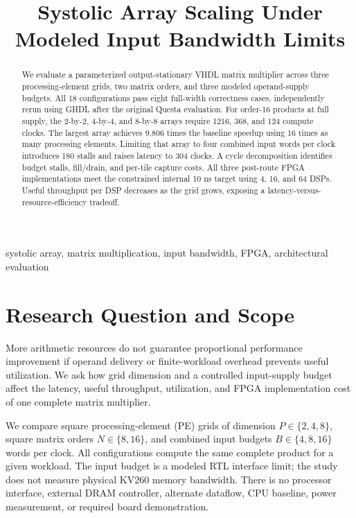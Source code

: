 \documentclass[conference]{IEEEtran}
\title{Systolic Array Scaling Under Modeled Input Bandwidth Limits}
\author{\IEEEauthorblockN{Ozlem Polat, Thomas Martin, and Keith Kamer}
\IEEEauthorblockA{University of Florida\\EEL5764 Computer Architecture, Fall 2026}}
\begin{document}
\maketitle
\begin{abstract}
We evaluate a parameterized output-stationary VHDL matrix multiplier across three processing-element grids, two matrix orders, and three modeled operand-supply budgets. All 18 configurations pass eight full-width correctness cases, independently rerun using GHDL after the original Questa evaluation. For order-16 products at full supply, the 2-by-2, 4-by-4, and 8-by-8 arrays require 1216, 368, and 124 compute clocks. The largest array achieves 9.806 times the baseline speedup using 16 times as many processing elements. Limiting that array to four combined input words per clock introduces 180 stalls and raises latency to 304 clocks. A cycle decomposition identifies budget stalls, fill/drain, and per-tile capture costs. All three post-route FPGA implementations meet the constrained internal 10 ns target using 4, 16, and 64 DSPs. Useful throughput per DSP decreases as the grid grows, exposing a latency-versus-resource-efficiency tradeoff.
\end{abstract}
\begin{IEEEkeywords}
systolic array, matrix multiplication, input bandwidth, FPGA, architectural evaluation
\end{IEEEkeywords}

\section{Research Question and Scope}
More arithmetic resources do not guarantee proportional performance improvement if operand delivery or finite-workload overhead prevents useful utilization. We ask how grid dimension and a controlled input-supply budget affect the latency, useful throughput, utilization, and FPGA implementation cost of one complete matrix multiplier.

We compare square processing-element (PE) grids of dimension $P\in\{2,4,8\}$, square matrix orders $N\in\{8,16\}$, and combined input budgets $B\in\{4,8,16\}$ words per clock. All configurations compute the same complete product for a given workload. The input budget is a modeled RTL interface limit; the study does not measure physical KV260 memory bandwidth. There is no processor interface, external DRAM controller, alternate dataflow, CPU baseline, power measurement, or required board demonstration.
\end{document}
